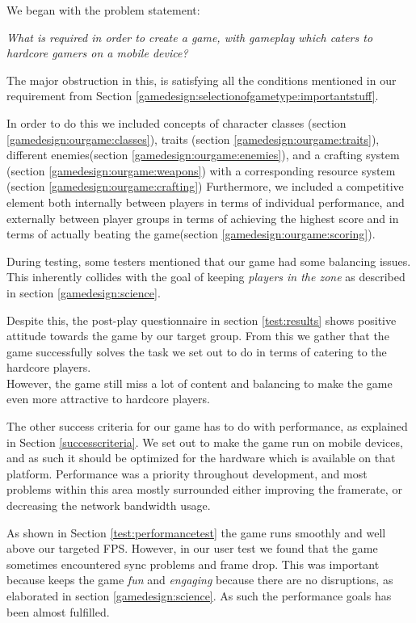 We began with the problem statement:
\begin{center}
\textit{What is required in order to create a game, with gameplay which caters to hardcore gamers on a mobile device?}
\end{center}

The major obstruction in this, is satisfying all the conditions mentioned in our requirement from Section \ref{gamedesign:selectionofgametype:importantstuff}.

In order to do this we included concepts of character classes (section \ref{gamedesign:ourgame:classes}), traits (section \ref{gamedesign:ourgame:traits}), different enemies(section \ref{gamedesign:ourgame:enemies}), and a crafting system (section \ref{gamedesign:ourgame:weapons}) with a corresponding resource system (section \ref{gamedesign:ourgame:crafting})
Furthermore, we included a competitive element both internally between players in terms of individual performance, and externally between player groups in terms of achieving the highest score and in terms of actually beating the game(section \ref{gamedesign:ourgame:scoring}).

During testing, some testers mentioned that our game had some balancing issues. 
This inherently collides with the goal of keeping \emph{players in the zone} as described in section \ref{gamedesign:science}. 

Despite this, the post-play questionnaire in section \ref{test:results} shows positive attitude towards the game by our target group.
From this we gather that the game successfully solves the task we set out to do in terms of catering to the hardcore players.\\
However, the game still miss a lot of content and balancing to make the game even more attractive to hardcore players.

The other success criteria for our game has to do with performance, as explained in Section \ref{successcriteria}.
We set out to make the game run on mobile devices, and as such it should be optimized for the hardware which is available on that platform. 
Performance was a priority throughout development, and most problems within this area mostly surrounded either improving the framerate, or decreasing the network bandwidth usage.

As shown in Section \ref{test:performancetest} the game runs smoothly and well above our targeted FPS.
However, in our user test we found that the game sometimes encountered sync problems and frame drop.
This was important because keeps the game \emph{fun} and \emph{engaging} because there are no disruptions, as elaborated in section \ref{gamedesign:science}.
As such the performance goals has been almost fulfilled.